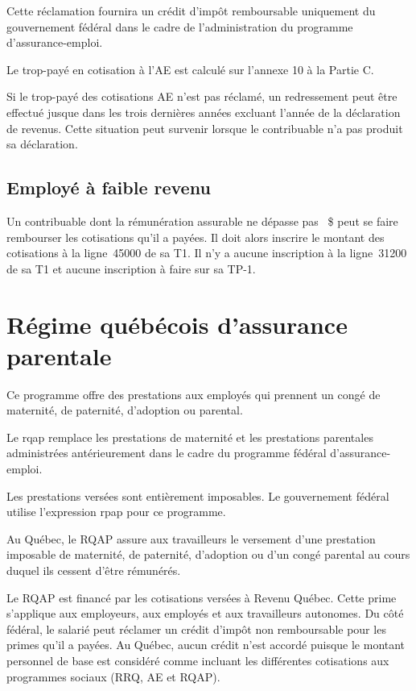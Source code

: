 Cette réclamation fournira un crédit d'impôt remboursable uniquement du gouvernement fédéral dans le cadre de l'administration du programme d'assurance-emploi.

Le trop-payé en cotisation à l'AE est calculé sur l'annexe 10 à la Partie C.

\begin{note}
	Si le trop-payé des cotisations AE n'est pas réclamé, un redressement peut être effectué jusque dans les trois dernières années excluant l'année de la déclaration de revenus. Cette situation peut survenir lorsque le contribuable n'a pas produit sa déclaration.
\end{note}


\subsection{Employé à faible revenu}
Un contribuable dont la rémunération assurable ne dépasse pas ~\$ peut se faire rembourser les cotisations qu'il a payées. Il doit alors inscrire le montant des cotisations à la ligne~45000 de sa T1. Il n'y a aucune inscription à la ligne~31200 de sa T1 et aucune inscription à faire sur sa TP-1.



\section{Régime québécois d'assurance parentale}
\begin{intro}
	Ce programme offre des prestations aux employés qui prennent un congé de maternité, de paternité, d'adoption ou parental.
\end{intro}
Le \acrfull{rqap} remplace les prestations de maternité et les prestations parentales administrées antérieurement dans le cadre du programme fédéral d'assurance-emploi. 

Les prestations versées sont entièrement imposables. Le gouvernement fédéral utilise l'expression \acrfull{rpap} pour ce programme.

Au Québec, le RQAP assure aux travailleurs le versement d'une prestation imposable de maternité, de paternité, d'adoption ou d'un congé parental au cours duquel ils cessent d'être rémunérés.

Le RQAP est financé par les cotisations versées à Revenu Québec. Cette prime s'applique aux employeurs, aux employés et aux travailleurs autonomes. Du côté fédéral, le salarié peut réclamer un crédit d'impôt non remboursable pour les primes qu'il a payées. Au Québec, aucun crédit n'est accordé puisque le montant personnel de base est considéré comme incluant les différentes cotisations aux programmes sociaux (RRQ, AE et RQAP).


